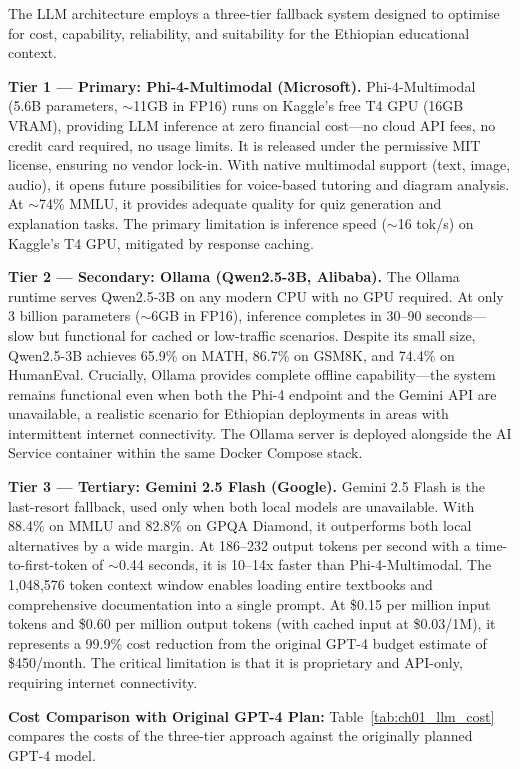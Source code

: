 The LLM architecture employs a three-tier fallback system designed to optimise for cost, capability, reliability, and suitability for the Ethiopian educational context.

\textbf{Tier 1 --- Primary: Phi-4-Multimodal (Microsoft).} Phi-4-Multimodal (5.6B parameters, $\sim$11GB in FP16) runs on Kaggle's free T4 GPU (16GB VRAM), providing LLM inference at zero financial cost---no cloud API fees, no credit card required, no usage limits. It is released under the permissive MIT license, ensuring no vendor lock-in. With native multimodal support (text, image, audio), it opens future possibilities for voice-based tutoring and diagram analysis. At $\sim$74\% MMLU, it provides adequate quality for quiz generation and explanation tasks. The primary limitation is inference speed ($\sim$16 tok/s) on Kaggle's T4 GPU, mitigated by response caching.

\textbf{Tier 2 --- Secondary: Ollama (Qwen2.5-3B, Alibaba).} The Ollama runtime serves Qwen2.5-3B on any modern CPU with no GPU required. At only 3 billion parameters ($\sim$6GB in FP16), inference completes in 30--90 seconds---slow but functional for cached or low-traffic scenarios. Despite its small size, Qwen2.5-3B achieves 65.9\% on MATH, 86.7\% on GSM8K, and 74.4\% on HumanEval. Crucially, Ollama provides complete offline capability---the system remains functional even when both the Phi-4 endpoint and the Gemini API are unavailable, a realistic scenario for Ethiopian deployments in areas with intermittent internet connectivity. The Ollama server is deployed alongside the AI Service container within the same Docker Compose stack.

\textbf{Tier 3 --- Tertiary: Gemini 2.5 Flash (Google).} Gemini 2.5 Flash is the last-resort fallback, used only when both local models are unavailable. With 88.4\% on MMLU and 82.8\% on GPQA Diamond, it outperforms both local alternatives by a wide margin. At 186--232 output tokens per second with a time-to-first-token of $\sim$0.44 seconds, it is 10--14x faster than Phi-4-Multimodal. The 1,048,576 token context window enables loading entire textbooks and comprehensive documentation into a single prompt. At \$0.15 per million input tokens and \$0.60 per million output tokens (with cached input at \$0.03/1M), it represents a 99.9\% cost reduction from the original GPT-4 budget estimate of \$450/month. The critical limitation is that it is proprietary and API-only, requiring internet connectivity.

\textbf{Cost Comparison with Original GPT-4 Plan:} Table~\ref{tab:ch01_llm_cost} compares the costs of the three-tier approach against the originally planned GPT-4 model.

